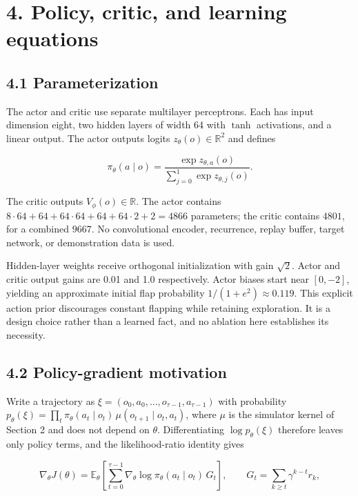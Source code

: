 \documentclass[
  11pt,
]{article}
\begin{document}
\section{4. Policy, critic, and learning
equations}\label{policy-critic-and-learning-equations}

\subsection{4.1 Parameterization}\label{parameterization}

The actor and critic use separate multilayer perceptrons. Each has input
dimension eight, two hidden layers of width 64 with \(\tanh\)
activations, and a linear output. The actor outputs logits
\(z_\theta(o)\in\mathbb R^2\) and defines

\[
\pi_\theta(a\mid o)=\frac{\exp z_{\theta,a}(o)}{\sum_{j=0}^{1}\exp z_{\theta,j}(o)}.
\]

The critic outputs \(V_\phi(o)\in\mathbb R\). The actor contains
\(8\cdot64+64+64\cdot64+64+64\cdot2+2=4866\) parameters; the critic
contains \(4801\), for a combined \(9667\). No convolutional encoder,
recurrence, replay buffer, target network, or demonstration data is
used.

Hidden-layer weights receive orthogonal initialization with gain
\(\sqrt2\). Actor and critic output gains are 0.01 and 1.0 respectively.
Actor biases start near \([0,-2]\), yielding an approximate initial flap
probability \(1/(1+e^2)\approx0.119\). This explicit action prior
discourages constant flapping while retaining exploration. It is a
design choice rather than a learned fact, and no ablation here
establishes its necessity.

\subsection{4.2 Policy-gradient
motivation}\label{policy-gradient-motivation}

Write a trajectory as \(\xi=(o_0,a_0,\ldots,o_{\tau-1},a_{\tau-1})\)
with probability
\(p_\theta(\xi)=\prod_t\pi_\theta(a_t\mid o_t)\,\mu(o_{t+1}\mid o_t,a_t)\),
where \(\mu\) is the simulator kernel of Section 2 and does not depend
on \(\theta\). Differentiating \(\log p_\theta(\xi)\) therefore leaves
only policy terms, and the likelihood-ratio identity gives

\[
\nabla_\theta J(\theta)
=\mathbb E_\theta\left[\sum_{t=0}^{\tau-1}\nabla_\theta\log\pi_\theta(a_t\mid o_t)\,G_t\right],
\qquad
G_t=\sum_{k\ge t}\gamma^{k-t}r_k ,
\]
\end{document}
